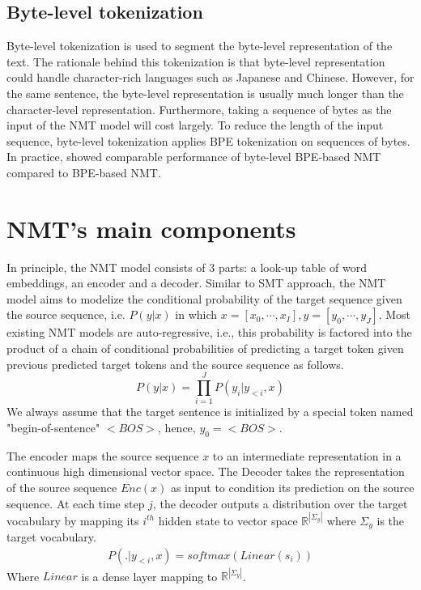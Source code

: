 \subsection{Byte-level tokenization}
Byte-level tokenization is used to segment the byte-level representation of the text. The rationale behind this tokenization is that byte-level representation could handle character-rich languages such as Japanese and Chinese. However, for the same sentence, the byte-level representation is usually much longer than the character-level representation. Furthermore, taking a sequence of bytes as the input of the NMT model will cost largely. To reduce the length of the input sequence, byte-level tokenization applies BPE tokenization on sequences of bytes. In practice, \cite{Wang19neural} showed comparable performance of byte-level BPE-based NMT compared to BPE-based NMT. 
\section{NMT's main components}
In principle, the NMT model consists of 3 parts: a look-up table of word embeddings, an encoder and a decoder. Similar to SMT approach, the NMT model aims to modelize the conditional probability of the target sequence given the source sequence, i.e. $P(y|x)$ in which $x=[x_0,\cdots,x_{I}], y=[y_0,\cdots,y_{J}]$. Most existing NMT models are auto-regressive, i.e., this probability is factored into the product of a chain of conditional probabilities of predicting a target token given previous predicted target tokens and the source sequence as follows.
\begin{equation}
P(y|x) = \displaystyle{\mathop{\prod}_{i=1}^{J}} P(y_i|y_{<i},x)
\end{equation}
We always assume that the target sentence is initialized by a special token named "begin-of-sentence" $<BOS>$, hence, $y_{0}=<BOS>$. 

The encoder maps the source sequence $x$ to an intermediate representation in a continuous high dimensional vector space. The Decoder takes the representation of the source sequence $Enc(x)$ as input to condition its prediction on the source sequence. At each time step $j$, the decoder outputs a distribution over the target vocabulary by mapping its $i^{th}$ hidden state to vector space $\mathbb{R}^{|\Sigma_y|}$ where $\Sigma_y$ is the target vocabulary.
\begin{equation}
\begin{array}{rcl}
P(.|y_{<i},x) = softmax(Linear(s_i))
\end{array}
\end{equation}
Where $Linear$ is a dense layer mapping to $\mathbb{R}^{|\Sigma_y|}$.

